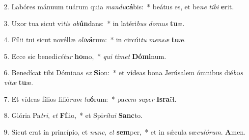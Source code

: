 2. Labóres mánuum tuárum quia \textit{man}\textit{du}\textbf{cá}bis:~*  beátus es, et be\textit{ne} \textit{ti}\textit{bi} \textbf{e}rit.\

3. Uxor tua sicut vi\textit{tis} \textit{ab}\textbf{ún}dans:~*  in latéri\textit{bus} \textit{do}\textit{mus} \textbf{tu}æ.\

4. Fílii tui sicut novéllæ \textit{o}\textit{li}\textbf{vá}rum:~*  in circúi\textit{tu} \textit{men}\textit{sæ} \textbf{tu}æ.\

5. Ecce sic benedi\textit{cé}\textit{tur} \textbf{ho}mo,~*  \textit{qui} \textit{ti}\textit{met} \textbf{Dó}\textbf{mi}num.\

6. Benedícat tibi Dómi\textit{nus} \textit{ex} \textbf{Si}on:~*  et vídeas bona Jerúsalem ómnibus dié\textit{bus} \textit{vi}\textit{tæ} \textbf{tu}æ.\

7. Et vídeas fílios filió\textit{rum} \textit{tu}\textbf{ó}rum:~*  pa\textit{cem} \textit{su}\textit{per} \textbf{Is}\textbf{ra}ël.\

8. Glória Pa\textit{tri}, \textit{et} \textbf{Fí}lio,~*  et Spi\textit{rí}\textit{tu}\textit{i} \textbf{Sanc}to.\

9. Sicut erat in princípio, et \textit{nunc}, \textit{et} \textbf{sem}per,~*  et in sǽcula sæ\textit{cu}\textit{ló}\textit{rum}. \textbf{A}men.\

